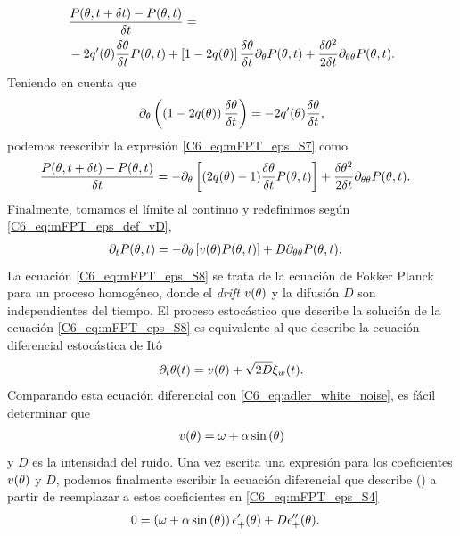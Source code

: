\documentclass[./main.tex]{subfiles}
\begin{document}
\begin{align}
    & \frac{P( \theta,t + \delta t) - P(\theta,t)}{\delta t}  = \nonumber \\ & - 2 q'(\theta) \frac{\delta\theta}{\delta t} P(\theta,t) + \left[ 1- 2 q(\theta) \right] \frac{\delta\theta}{\delta t} \partial_\theta P(\theta,t) +  \frac{\delta\theta^2}{2 \delta t}\partial_{\theta \theta} P(\theta,t).
    \label{C6_eq:mFPT_eps_S7}
\end{align}
Teniendo en cuenta que 
\begin{align}
    \partial_\theta\left( \left(1-2q(\theta)\right) \frac{\delta\theta}{\delta t} \right) = - 2 q'(\theta) \frac{\delta\theta}{\delta t}, \nonumber
\end{align}
podemos reescribir la expresión \ref{C6_eq:mFPT_eps_S7} como 
\begin{align}
    \frac{P( \theta,t + \delta t)  - P(\theta,t) }{\delta t} &= - \partial_\theta \left[ (2q(\theta)-1) \frac{\delta\theta}{\delta t} P(\theta,t) \right] + \frac{\delta\theta^2}{2 \delta t}\partial_{\theta \theta} P(\theta,t). 
\end{align}
Finalmente, tomamos el límite al continuo y redefinimos según \ref{C6_eq:mFPT_eps_def_vD}, 
\begin{align}
   \partial_t P(\theta,t) &= - \partial_\theta \left[ v(\theta) P(\theta,t) \right] + D \partial_{\theta \theta} P(\theta,t).
   \label{C6_eq:mFPT_eps_S8}
\end{align}
La ecuación \ref{C6_eq:mFPT_eps_S8} se trata de la ecuación de Fokker Planck para un proceso homogéneo, donde el \textit{drift} $v(\theta)$ y la difusión $D$ son independientes del tiempo. El proceso estocástico que describe la solución de la ecuación \ref{C6_eq:mFPT_eps_S8} es equivalente al que describe la ecuación diferencial estocástica de Itô \cite{Gardiner}
\begin{equation}
    \partial_t  \theta(t) =  v(\theta) + \sqrt{2D} \xi_w(t).
\end{equation}
Comparando esta ecuación diferencial con \ref{C6_eq:adler_white_noise}, es fácil determinar que 
\begin{align}
    v(\theta) = \omega + \alpha \sin{(\ensuremath{\theta})}  \label{C6_eq:mFPT_eps_def_vD_solved}
\end{align}
y $D$ es la intensidad del ruido. Una vez escrita una expresión para los coeficientes $v(\theta)$ y $D$, podemos finalmente escribir la ecuación diferencial que describe \epsplus(\xx) a partir de reemplazar a estos coeficientes en \ref{C6_eq:mFPT_eps_S4}
\begin{align}
     0 &=  \left(\omega + \alpha \sin{(\ensuremath{\theta})}\right) \epsilon_{+}'(\theta) + D \epsilon_{+}''(\theta) .
     \label{C6_eq:mFPT_eps_eq_res}
\end{align}
\end{document}
